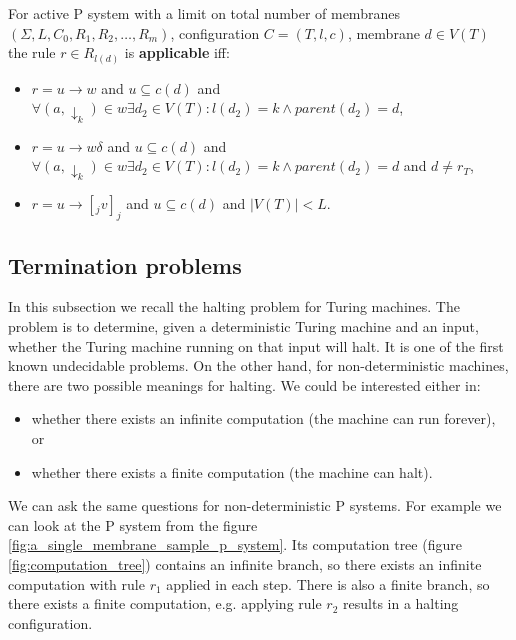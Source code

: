 \begin{definition}
  \label{def:applicable_rule_of_active_p_system_with_a_limit_on_total_number_of_membranes}
  For active P system with a limit on total number of membranes $(\Sigma, L, C_0, R_1, R_2, \dots , R_m)$, configuration $C = (T, l, c)$, membrane $d\in V(T)$ the rule $r\in R_{l(d)}$ is {\bf applicable} iff:
  \begin{itemize}
    \item $r = u\rightarrow w$ and $u\subseteq c(d)$ and $\forall (a,\downarrow_k)\in w \exists d_2\in V(T): l(d_2)=k \wedge parent(d_2) = d$,
    \item $r = u\rightarrow w\delta$ and $u\subseteq c(d)$ and $\forall (a,\downarrow_k)\in w \exists d_2\in V(T): l(d_2)=k \wedge parent(d_2) = d$ and $d\neq r_T$,
    \item $r = u\rightarrow [_j v]_j$ and $u\subseteq c(d)$ and $|V(T)|<L$.
  \end{itemize}
\end{definition}


\subsection{Termination problems} %
\label{sub:termination_problems}

In this subsection we recall the halting problem for Turing machines. The problem is to determine, given a deterministic Turing machine and an input, whether the Turing machine running on that input will halt. It is one of the first known undecidable problems. On the other hand, for non-deterministic machines, there are two possible meanings for halting. We could be interested either in:
\begin{itemize}
  \item whether there exists an infinite computation (the machine can run forever), or
  \item whether there exists a finite computation (the machine can halt).
\end{itemize}

We can ask the same questions for non-deterministic P systems.
For example we can look at the P system from the figure \ref{fig:a_single_membrane_sample_p_system}. Its computation tree (figure \ref{fig:computation_tree}) contains an infinite branch, so there exists an infinite computation with rule $r_1$ applied in each step. There is also a finite branch, so there exists a finite computation, e.g. applying rule $r_2$ results in a halting configuration.

